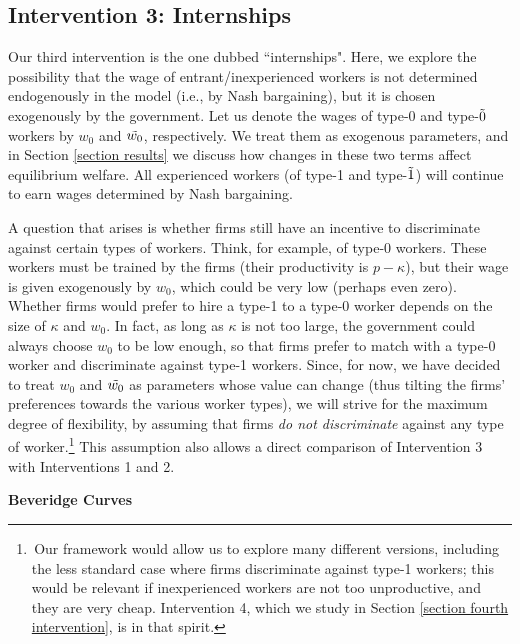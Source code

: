 \documentclass[12pt]{article} %
\theoremstyle{definition}
\begin{document}
\subsection{Intervention 3: Internships} \label{section internships}

Our third intervention is the one dubbed ``internships". Here, we explore the possibility that the wage of entrant/inexperienced workers is not determined endogenously in the model (i.e., by Nash bargaining), but it is chosen exogenously by the government. Let us denote the wages of type-0 and type-$\Tilde{0}$ workers by $w_0$ and $\Tilde{w_0}$, respectively. We treat them as exogenous parameters, and in Section \ref{section results} we discuss how changes in these two terms affect equilibrium welfare. All experienced workers (of type-1 and type-$\Tilde{1}$) will continue to earn wages determined by Nash bargaining. 

A question that arises is whether firms still have an incentive to discriminate against certain types of workers. Think, for example, of type-0 workers. These workers must be trained by the firms (their productivity is $p-\kappa$), but their wage is given exogenously by $w_0$, which could be very low (perhaps even zero). Whether firms would prefer to hire a type-1 to a type-0 worker depends on the size of $\kappa$ and $w_0$. In fact, as long as $\kappa$ is not too large, the government could always choose $w_0$ to be low enough, so that firms prefer to match with a type-0 worker and discriminate against type-1 workers. Since, for now, we have decided to treat $w_0$ and $\Tilde{w_0}$ as parameters whose value can change (thus tilting the firms' preferences towards the various worker types), we will strive for the maximum degree of flexibility, by assuming that firms \textit{do not discriminate} against any type of worker.\footnote{\,Our framework would allow us to explore many different versions, including the less standard case where firms discriminate against type-1 workers; this would be relevant if inexperienced workers are not too unproductive, and they are very cheap. Intervention 4, which we study in Section \ref{section fourth intervention}, is in that spirit.} This assumption also allows a direct comparison of Intervention 3 with Interventions 1 and 2. 

\bigskip 

\noindent \textbf{Beveridge Curves} 
\end{document}
